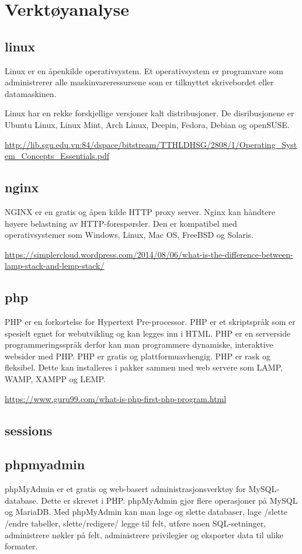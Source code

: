 \clearpage

\section{Verktøyanalyse}


\subsection{linux}
Linux er en åpenkilde operativsystem. Et operativsystem er programvare som administrerer alle maskinvareressursene som er tilknyttet skrivebordet eller datamaskinen. 

Linux har en rekke forskjellige versjoner kalt distribusjoner. De disribusjonene er Ubuntu Linux, Linux Mint, Arch Linux, Deepin, Fedora, Debian og openSUSE.

\url{http://lib.sgu.edu.vn:84/dspace/bitstream/TTHLDHSG/2808/1/Operating_System_Concepts_Essentials.pdf}

\subsection{nginx}
NGINX er en gratis og åpen kilde HTTP proxy server. Nginx kan håndtere høyere belastning av HTTP-forespørsler. Den er kompatibel med operativsystemer som Windows, Linux, Mac OS, FreeBSD og Solaris.

\url{https://simplercloud.wordpress.com/2014/08/06/what-is-the-difference-between-lamp-stack-and-lemp-stack/}


\subsection{php}
PHP er en forkortelse for Hypertext Pre-processor. PHP er et skriptspråk som er spesielt egnet for webutvikling og kan legges inn i HTML. PHP er en serverside programmeringsspråk derfor kan man programmere dynamiske, interaktive websider med PHP. PHP er gratis og plattformuavhengig. PHP er rask og fleksibel. Dette kan installeres i pakker sammen med web servere som LAMP, WAMP, XAMPP og LEMP.

\url{https://www.guru99.com/what-is-php-first-php-program.html}

\subsection{sessions}

\subsection{phpmyadmin}
phpMyAdmin er et gratis og web-basert administrasjonsverktøy for MySQL-database. Dette er skrevet i PHP. phpMyAdmin gjør flere operasjoner på MySQL og MariaDB. Med phpMyAdmin kan man lage og slette databaser, lage /slette /endre tabeller, slette/redigere/ legge til felt, utføre noen SQL-setninger, administrere nøkler på felt, administrere privilegier og eksporter data til ulike formater.

